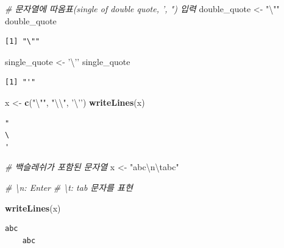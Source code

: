 \documentclass[
  11pt,
]{krantz}
\newenvironment{Shaded}{\begin{snugshade}}{\end{snugshade}}
\newcommand{\CharTok}[1]{\textcolor[rgb]{0.5,0.5,0.5}{#1}}
\newcommand{\CommentTok}[1]{\textcolor[rgb]{0.37,0.37,0.37}{\textit{#1}}}
\newcommand{\KeywordTok}[1]{\textcolor[rgb]{0.27,0.27,0.27}{\textbf{#1}}}
\newcommand{\NormalTok}[1]{#1}
\newcommand{\StringTok}[1]{\textcolor[rgb]{0.5,0.5,0.5}{#1}}
\begin{document}
\footnotesize

\begin{Shaded}
\begin{Highlighting}[]
\CommentTok{# 문자열에 따옴표(single of double quote, ', ") 입력}
\NormalTok{double_quote <-}\StringTok{ "}\CharTok{\textbackslash{}"}\StringTok{"} 
\NormalTok{double_quote}
\end{Highlighting}
\end{Shaded}

\begin{verbatim}
[1] "\""
\end{verbatim}

\begin{Shaded}
\begin{Highlighting}[]
\NormalTok{single_quote <-}\StringTok{ '}\CharTok{\textbackslash{}'}\StringTok{'} 
\NormalTok{single_quote}
\end{Highlighting}
\end{Shaded}

\begin{verbatim}
[1] "'"
\end{verbatim}

\begin{Shaded}
\begin{Highlighting}[]
\NormalTok{x <-}\StringTok{ }\KeywordTok{c}\NormalTok{(}\StringTok{"}\CharTok{\textbackslash{}"}\StringTok{"}\NormalTok{, }\StringTok{"}\CharTok{\textbackslash{}\textbackslash{}}\StringTok{"}\NormalTok{, }\StringTok{'}\CharTok{\textbackslash{}'}\StringTok{'}\NormalTok{)}
\KeywordTok{writeLines}\NormalTok{(x)}
\end{Highlighting}
\end{Shaded}

\begin{verbatim}
"
\
'
\end{verbatim}

\begin{Shaded}
\begin{Highlighting}[]
\CommentTok{# 백슬레쉬가 포함된 문자열}
\NormalTok{x <-}\StringTok{ "abc}\CharTok{\textbackslash{}n\textbackslash{}t}\StringTok{abc"}

\CommentTok{# \textbackslash{}n: Enter}
\CommentTok{# \textbackslash{}t: tab 문자를 표현}

\KeywordTok{writeLines}\NormalTok{(x)}
\end{Highlighting}
\end{Shaded}

\begin{verbatim}
abc
    abc
\end{verbatim}
\end{document}

